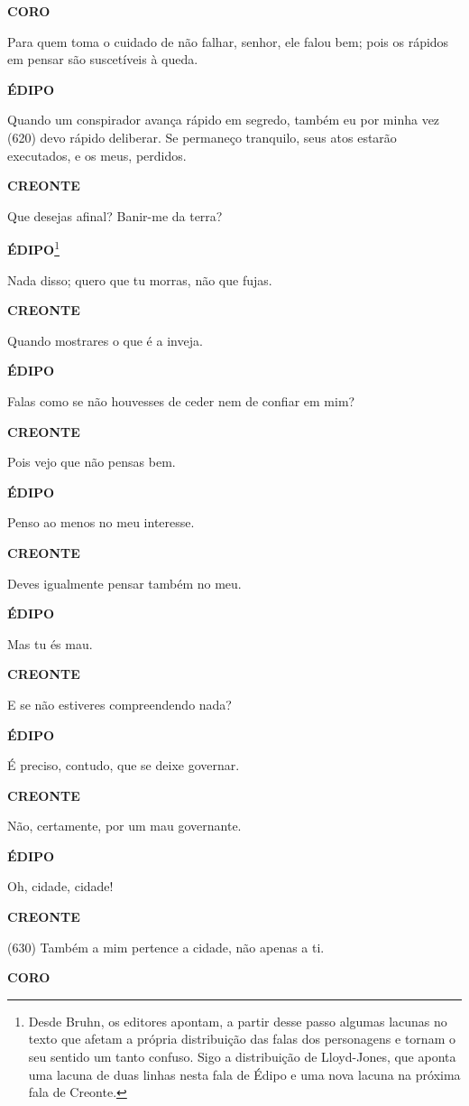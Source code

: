 \textbf{CORO}

Para quem toma o cuidado de não falhar, senhor, ele falou bem; pois os
rápidos em pensar são suscetíveis à queda.

\textbf{ÉDIPO }

Quando um conspirador avança rápido em segredo, também eu por minha vez
(620) devo rápido deliberar. Se permaneço tranquilo, seus atos estarão
executados, e os meus, perdidos.

\textbf{CREONTE}

Que desejas afinal? Banir-me da terra?

\textbf{ÉDIPO}\footnote{Desde Bruhn, os editores apontam, a partir desse
  passo algumas lacunas no texto que afetam a própria distribuição das
  falas dos personagens e tornam o seu sentido um tanto confuso. Sigo a
  distribuição de Lloyd-Jones, que aponta uma lacuna de duas linhas
  nesta fala de Édipo e uma nova lacuna na próxima fala de Creonte.}

Nada disso; quero que tu morras, não que fujas.

\textbf{CREONTE}

Quando mostrares o que é a inveja.

\textbf{ÉDIPO }

Falas como se não houvesses de ceder nem de confiar em mim?

\textbf{CREONTE}

Pois vejo que não pensas bem.

\textbf{ÉDIPO }

Penso ao menos no meu interesse.

\textbf{CREONTE}

Deves igualmente pensar também no meu.

\textbf{ÉDIPO }

Mas tu és mau.

\textbf{CREONTE}

E se não estiveres compreendendo nada?

\textbf{ÉDIPO }

É preciso, contudo, que se deixe governar.

\textbf{CREONTE}

Não, certamente, por um mau governante.

\textbf{ÉDIPO }

Oh, cidade, cidade!

\textbf{CREONTE}

(630) Também a mim pertence a cidade, não apenas a ti.

\textbf{CORO}

